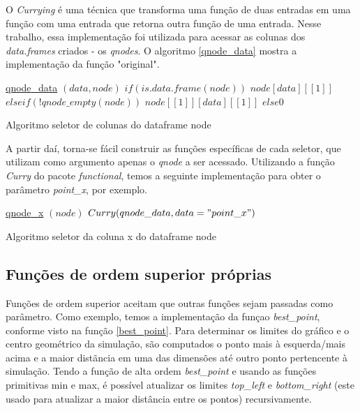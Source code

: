 \documentclass[rel_mlp]{iiufrgs}
\begin{document}
    O \textit{Currying} é uma técnica que transforma uma função de duas entradas em uma função com uma entrada que retorna outra função de uma entrada. Nesse trabalho, essa implementação foi utilizada para acessar as colunas dos \textit{data.frames} criados - os \textit{qnodes}. O algoritmo \ref{qnode_data} mostra a implementação da função "original".
    \begin{algorithm}
	\label{qnode_data}
    \underline{qnode{\_}data} $(data, node)$\;
	$if(is.data.frame(node)) $\;
    $node[data][[1]] $\;
  	$else if(!qnode{\_}empty(node)) $\;
    $node[[1]][data][[1]] $\;
  	$else 0 $\;
	\caption{Algoritmo seletor de colunas do dataframe node}
	\end{algorithm}

    A partir daí, torna-se fácil construir as funções específicas de cada seletor, que utilizam como argumento apenas o \textit{qnode} a ser acessado. Utilizando a função \textit{Curry} do pacote \textit{functional}, temos a seguinte implementação para obter o parâmetro \textit{point{\_}x}, por exemplo.

    \begin{algorithm}
	\label{qnode_x}
    \underline{qnode{\_}x} $(node)$\;
	$Curry(qnode{\_}data, data="point{\_}x") $\;
	\caption{Algoritmo seletor da coluna x do dataframe node}
	\end{algorithm}

	\subsection{Funções de ordem superior próprias}

    Funções de ordem superior aceitam que outras funções sejam passadas como parâmetro. Como exemplo, temos a implementação da funçao
        \textit{best{\_}point}, conforme visto na função \ref{best_point}. Para determinar os limites do gráfico e o centro geométrico da simulação,
         são computados o ponto mais à esquerda/mais acima e a maior distãncia em uma das dimensões até outro ponto pertencente à simulação. Tendo a função de alta ordem \textit{best{\_}point} e usando as funções primitivas min e max, é possível atualizar os limites \textit{top{\_}left} e \textit{bottom{\_}right} (este usado para atualizar a maior distância entre os pontos) recursivamente.
\end{document}
